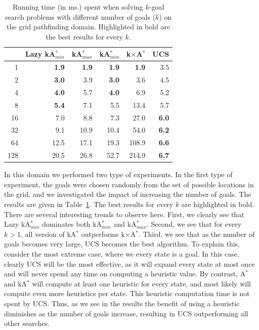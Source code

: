 \documentclass{aicom2e}
\newcommand{\kgs}{$k$-goal search}
\newcommand{\astar}{A$^*$}
\newcommand{\kastar}{kA$^*$}
\newcommand{\kastarmin}{kA$^*_{min}$}
\newcommand{\kastarmax}{kA$^*_{max}$}
\newcommand{\kxastar}{k$\times$A$^*$}
\begin{document}
\begin{table}[]
    \centering
    \begin{tabular}{|r|r|r|r|r|r|}
    \hline
        & \multicolumn{1}{c|}{Lazy \kastarmin{}} & \kastarmax &      \kastarmin       &  \kxastar & UCS       \\

        \hline
1     & \textbf{1.9}                 & \textbf{1.9} & \textbf{1.9} & \textbf{1.9} & 3.5          \\
2     & \textbf{3.0}                 & 3.9          & \textbf{3.0} & 3.6          & 4.5          \\
4     & \textbf{4.0}                 & 5.7          & \textbf{4.0} & 6.9          & 5.2          \\
8     & \textbf{5.4}                 & 7.1          & 5.5          & 13.4         & 5.7          \\
16    & 7.0                          & 8.8          & 7.3          & 27.0         & \textbf{6.0} \\
32    & 9.1                          & 10.9         & 10.4         & 54.0         & \textbf{6.2} \\
64    & 12.5                         & 17.1         & 19.3         & 108.9        & \textbf{6.6} \\
128   & 20.5                         & 26.8         & 52.7         & 214.9 &
\textbf{6.7}\\
\hline
    \end{tabular}
    \caption{Running time (in ms.) spent when solving \kgs{} problems with different number of goals ($k$) on the grid pathfinding domain. Highlighted in bold are the best results for every $k$.}
    \label{tab:pathfinding-runtime}
\end{table}

In this domain we performed two type of experiments. In the first type of experiment, the goals were chosen randomly from the set of possible locations in the grid, and we investigated the impact of increasing the number of goals. The results are given in Table~\ref{tab:pathfinding-runtime}. The best results for every $k$ are highlighted in bold. There are several interesting trends to observe here. First, we clearly see that Lazy \kastarmin{} dominates both \kastarmin{} and \kastarmax{}. Second, we see that for every $k>1$, all version of \kastar{} outperforms \kxastar{}. Third, we see that as the number of goals becomes very large, UCS becomes the best algorithm. To explain this, consider the most extreme case, where we every state is a goal. In this case, clearly UCS will be the most effective, as it will expand every state at most once and will never spend any time on computing a heuristic value. By contrast, \astar{} and \kastar{} will compute at least one heuristic for every state, and most likely will compute even more heuristics per state. This heuristic computation time is not spent by UCS. Thus, as we see in the results the benefit of using a heuristic diminishes as the number of goals increase, resulting in UCS outperforming all other searches. 
\end{document}
